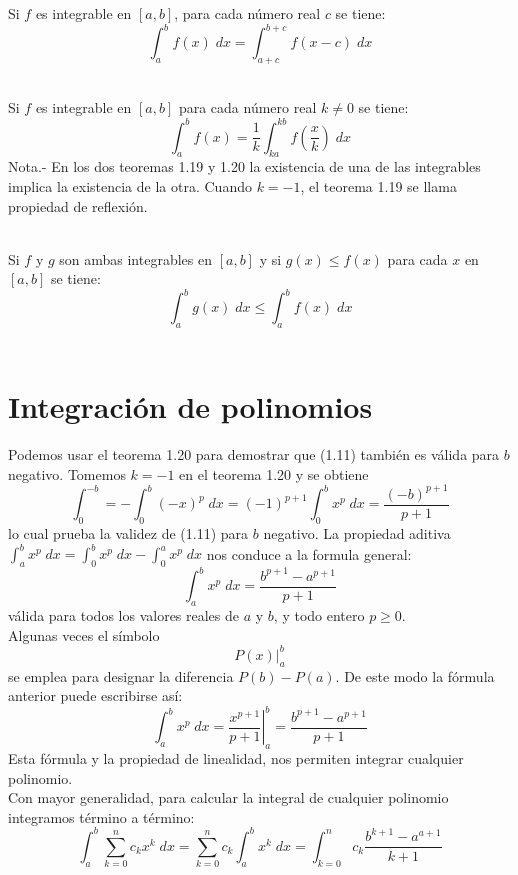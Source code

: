 \begin{teo} Si $f$ es integrable en $[a,b]$, para cada número real $c$ se tiene: $$\int_a^b f(x) \; dx = \int_{a+c}^{b+c} f(x-c)\; dx$$\\
\end{teo}

\begin{teo} Si $f$ es integrable en $[a,b]$ para cada número real $k\neq 0$ se tiene: $$\int_a^b f(x) = \dfrac{1}{k} \int_{ka}^{kb} f\left(\dfrac{x}{k}\right)\; dx$$
    Nota.-\; En los dos teoremas 1.19 y 1.20 la existencia de una de las integrables implica la existencia de la otra. Cuando $k=-1$, el teorema 1.19 se llama propiedad de reflexión.\\\\
\end{teo}

\begin{teo} Si $f$ y $g$ son ambas integrables en $[a,b]$ y si $g(x)\leq f(x)$ para cada $x$ en $[a,b]$ se tiene: $$\int_a^b g(x)\; dx \leq \int_a^b f(x)\; dx$$\\
\end{teo}


\section{Integración de polinomios}
Podemos usar el teorema 1.20 para demostrar que (1.11) también es válida para $b$ negativo. Tomemos $k=-1$ en el teorema 1.20 y se obtiene $$\int_0^{-b} = - \int_0^b (-x)^p \; dx = (-1)^{p+1} \int_0^b x^p \; dx = \dfrac{(-b)^{p+1}}{p+1}$$ lo cual prueba la validez de (1.11) para $b$ negativo. La propiedad aditiva $\int_a^b x^p \; dx = \int_0^b x^p \; dx - \int_0^a x^p \;dx$ nos conduce a la formula general: $$\int_a^b x^p \; dx = \dfrac{b^{p+1}-a^{p+1}}{p+1}$$
válida para todos los valores reales de $a$ y $b$, y todo entero $p\geq 0$.\\
Algunas veces el símbolo $$P(x)\left.\right|_a^b$$
se emplea para designar la diferencia $P(b)-P(a)$. De este modo la fórmula anterior puede escribirse así: $$\int_a^b x^p \; dx = \left.\dfrac{x^{p+1}}{p+1}\right|_a^b = \dfrac{b^{p+1}-a^{p+1}}{p+1}$$
Esta fórmula y la propiedad de linealidad, nos permiten integrar cualquier polinomio.\\
Con mayor generalidad, para calcular la integral de cualquier polinomio integramos término a término: $$\int_a^b \sum_{k=0}^n c_k x^k \; dx = \sum_{k=0}^n c_k \int_a^b x^k  \; dx = \int_{k=0}^n c_k \dfrac{b^{k+1} - a^{a+1}}{k+1}$$\\


